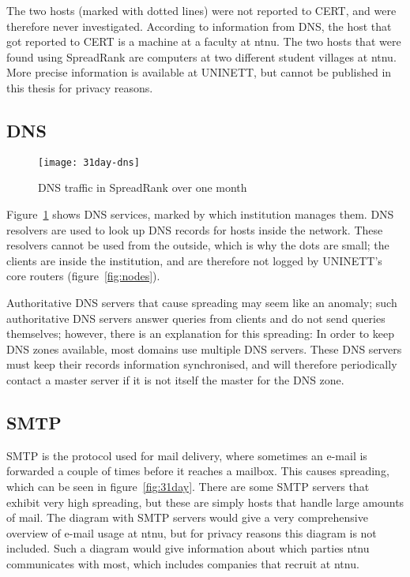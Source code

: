 The two hosts (marked with dotted lines) were not reported to CERT, and were therefore never investigated.
According to information from \gls{DNS}, the host that got reported to CERT is a machine at a faculty at \gls{ntnu}.
The two hosts that were found using SpreadRank are computers at two different student villages at \gls{ntnu}.
More precise information is available at UNINETT, but cannot be published in this thesis for privacy reasons.


\subsection{DNS}
\begin{figure}[h]
	\caption{DNS traffic in SpreadRank over one month}
	\label{fig:31day-dns}
	\centering
		\texttt{[image: 31day-dns]}
\end{figure}

Figure~\ref{fig:31day-dns} shows \gls{DNS} services, marked by which institution manages them.
DNS resolvers are used to look up DNS records for hosts inside the network.
These resolvers cannot be used from the outside, which is why the dots are small;
 the clients are inside the institution, and are therefore not logged by UNINETT's core routers (figure~\ref{fig:nodes}).

Authoritative DNS servers that cause spreading may seem like an anomaly;
 such authoritative DNS servers answer queries from clients and do not send queries themselves;
however, there is an explanation for this spreading:
In order to keep DNS zones available, most domains use multiple DNS servers.
These DNS servers must keep their records information synchronised, and will therefore periodically contact a master server if it is not itself the master for the DNS zone.


\subsection{SMTP}
SMTP is the protocol used for mail delivery, where sometimes an e-mail is forwarded a couple of times before it reaches a mailbox.
This causes spreading, which can be seen in figure~\ref{fig:31day}.
There are some SMTP servers that exhibit very high spreading, but these are simply hosts that handle large amounts of mail.
The diagram with SMTP servers would give a very comprehensive overview of e-mail usage at \gls{ntnu},
 but for privacy reasons this diagram is not included.
Such a diagram would give information about which parties \gls{ntnu} communicates with most,
 which includes companies that recruit at \gls{ntnu}.


